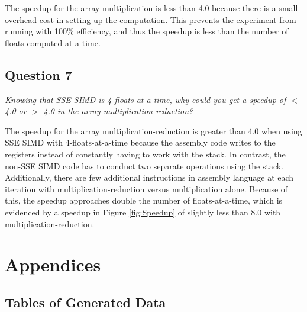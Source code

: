 \documentclass{article}
\begin{document}
The speedup for the array multiplication is less than 4.0 because there is a small overhead cost in setting up the computation.  This prevents the experiment from running with 100\% efficiency, and thus the speedup is less than the number of floats computed at-a-time.

\subsection*{Question 7}
\textit{Knowing that SSE SIMD is 4-floats-at-a-time, why could you get a speedup of $<$ 4.0 or $>$ 4.0 in the array multiplication-reduction?}

The speedup for the array multiplication-reduction is greater than 4.0 when using SSE SIMD with 4-floats-at-a-time because the assembly code writes to the registers instead of constantly having to work with the stack.  In contrast, the non-SSE SIMD code has to conduct two separate operations using the stack.  Additionally, there are few additional instructions in assembly language at each iteration with multiplication-reduction versus multiplication alone.  Because of this, the speedup approaches double the number of floats-at-a-time, which is evidenced by a speedup in Figure \ref{fig:Speedup} of slightly less than 8.0 with multiplication-reduction.

\newpage
\section{Appendices}
\subsection{Tables of Generated Data}
\label{app:Data}
\end{document}
